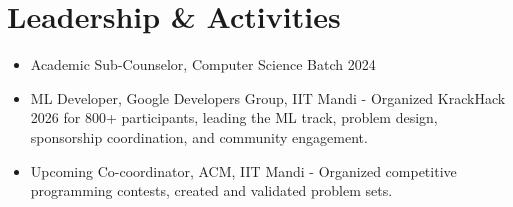 \documentclass[a4paper,10pt]{article}
\begin{document}
\vspace{2pt}
\section*{Leadership \& Activities}
\vspace{2pt}
\begin{itemize}[label=--]
    \item Academic Sub-Counselor, Computer Science Batch 2024
    \item ML Developer, Google Developers Group, IIT Mandi - Organized KrackHack 2026 for 800+ participants, leading the ML track, problem design, sponsorship coordination, and community engagement.
    \item Upcoming Co-coordinator, ACM, IIT Mandi - Organized competitive programming contests, created and validated problem sets.
\end{itemize}
\end{document}
